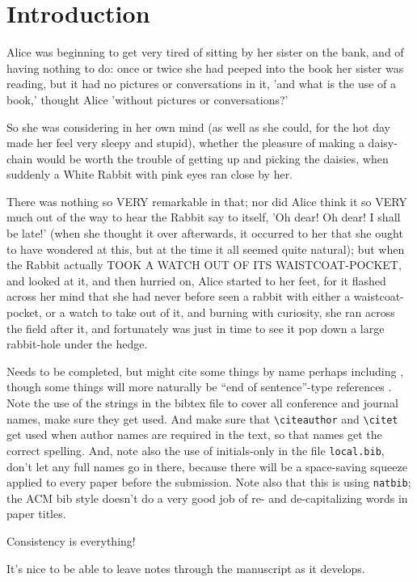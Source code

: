 \section{Introduction}
\label{sec-intro}

Alice was beginning to get very tired of sitting by her sister on the
bank, and of having nothing to do: once or twice she had peeped into
the book her sister was reading, but it had no pictures or
conversations in it, 'and what is the use of a book,' thought Alice
'without pictures or conversations?'

So she was considering in her own mind (as well as she could, for the
hot day made her feel very sleepy and stupid), whether the pleasure
of making a daisy-chain would be worth the trouble of getting up and
picking the daisies, when suddenly a White Rabbit with pink eyes ran
close by her.

There was nothing so VERY remarkable in that; nor did Alice think it
so VERY much out of the way to hear the Rabbit say to itself, 'Oh
dear!
Oh dear!
I shall be late!'
(when she thought it over afterwards, it occurred to her that she
ought to have wondered at this, but at the time it all seemed quite
natural); but when the Rabbit actually TOOK A WATCH OUT OF ITS
WAISTCOAT-POCKET, and looked at it, and then hurried on, Alice
started to her feet, for it flashed across her mind that she had
never before seen a rabbit with either a waistcoat-pocket, or a watch
to take out of it, and burning with curiosity, she ran across the
field after it, and fortunately was just in time to see it pop down a
large rabbit-hole under the hedge.


Needs to be completed, but might cite some things by name perhaps
including {\citet{zm06compsurv}}, though some things will more
naturally be ``end of sentence''-type references {\citep{wmb99mg}}.
Note the use of the strings in the bibtex file to cover all
conference and journal names, make sure they get used.
And make sure that {\verb+\citeauthor+} and {\verb+\citet+} get used
when author names are required in the text, so that names get the
correct spelling.
And, note also the use of initials-only in the file
{\verb+local.bib+}, don't let any full names go in there, because
there will be a space-saving squeeze applied to every paper before
the submission.
Note also that this is using {\verb+natbib+}; the ACM bib style
doesn't do a very good job of re- and de-capitalizing words in paper
titles.

Consistency is everything!


It's nice to be able to leave notes through the manuscript as it
develops.

